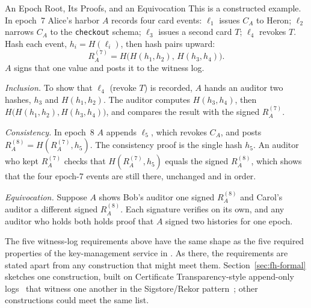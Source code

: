\documentclass[11pt,a4paper]{article}
\theoremstyle{definition}
\theoremstyle{remark}
\begin{document}
\begin{pdexample}{An Epoch Root, Its Proofs, and an Equivocation}
\setlength{\parskip}{4pt plus 1pt}
This is a constructed example. In epoch~7 Alice's harbor $A$ records four card events: $\ell_1$ issues $C_A$ to Heron; $\ell_2$ narrows $C_A$ to the \texttt{checkout} schema; $\ell_3$ issues a second card $T$; $\ell_4$ revokes $T$. Hash each event, $h_i=H(\ell_i)$, then hash pairs upward:
\[
R_A^{(7)}=H\bigl(H(h_1,h_2),\,H(h_3,h_4)\bigr).
\]
$A$ signs that one value and posts it to the witness log.

\emph{Inclusion.} To show that $\ell_4$ (revoke $T$) is recorded, $A$ hands an auditor two hashes, $h_3$ and $H(h_1,h_2)$. The auditor computes $H(h_3,h_4)$, then $H\bigl(H(h_1,h_2),H(h_3,h_4)\bigr)$, and compares the result with the signed $R_A^{(7)}$.

\emph{Consistency.} In epoch~8 $A$ appends $\ell_5$, which revokes $C_A$, and posts $R_A^{(8)}=H(R_A^{(7)},h_5)$. The consistency proof is the single hash $h_5$. An auditor who kept $R_A^{(7)}$ checks that $H(R_A^{(7)},h_5)$ equals the signed $R_A^{(8)}$, which shows that the four epoch-7 events are still there, unchanged and in order.

\emph{Equivocation.} Suppose $A$ shows Bob's auditor one signed $R_A^{(8)}$ and Carol's auditor a different signed $R_A^{(8)}$. Each signature verifies on its own, and any auditor who holds both holds proof that $A$ signed two histories for one epoch.
\end{pdexample}
The five witness-log requirements above have the same shape as the five required properties of the key-management service in . As there, the requirements are stated apart from any construction that might meet them. Section~\ref{sec:fh-formal} sketches one construction, built on Certificate Transparency-style append-only logs~ that witness one another in the Sigstore/Rekor pattern~; other constructions could meet the same list.


\end{document}
